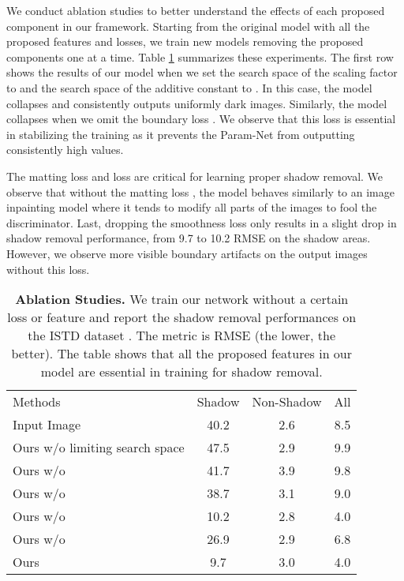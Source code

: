 \documentclass[runningheads]{llncs}
\begin{document}
We conduct  ablation studies to better understand the effects of each proposed component in our framework. Starting from the original model with all the proposed features and losses, we train new  models removing the proposed components one at a time. Table \ref{table:abl} summarizes these experiments. The first row shows the results of our model when we set the search space of the scaling factor  to  and the search space of the additive constant  to . In this case, the model collapses and consistently outputs uniformly dark images. Similarly, the model collapses when we omit the boundary loss . We observe that this loss is essential in stabilizing the training as it prevents the Param-Net from outputting consistently high values. 
\par The matting loss  and   loss are critical for learning  proper shadow removal. We observe that without the matting loss , the model behaves similarly to an image inpainting model where it tends to modify all parts of the images to fool the discriminator.
Last, dropping the smoothness loss  only results in a  slight drop in shadow removal performance, from 9.7 to 10.2  RMSE on the shadow areas. However, we observe more visible boundary artifacts on the output images without this loss. \setlength{\tabcolsep}{4pt}
\begin{table}[t]
\begin{center}
\caption{\textbf{Ablation Studies.} We train our network without a certain loss or feature and report the shadow removal performances on the ISTD dataset \cite{Wang_2018_CVPR}. The metric is RMSE (the lower, the better). The table shows that all the proposed features in our model are essential in training for shadow removal.}
\label{table:abl}
\begin{tabular}{lccc}
\hline\noalign{\smallskip}
Methods       & Shadow& Non-Shadow& All  \\ 
\noalign{\smallskip}
\midrule
\noalign{\smallskip}
Input Image  & 40.2  & 2.6 & 8.5\\ 
\midrule
Ours w/o limiting search space  &47.5  &2.9&9.9\\
Ours w/o   &41.7  &3.9 &9.8\\ 
Ours w/o   & 38.7 &3.1 &9.0\\
Ours w/o   & 10.2  &2.8 &4.0\\
Ours w/o  & 26.9  &2.9 &6.8\\
\midrule
Ours  & 9.7  &3.0 &4.0\\
\hline
\end{tabular}
\end{center}
\end{table}
\setlength{\tabcolsep}{1.4pt}
\end{document}
